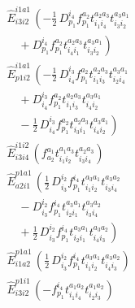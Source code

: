 \documentclass[11pt]{article}
\begin{document}
\begin{align}
&\hat{E}^{i1a1}_{i3i2}\,\left(- \tfrac{1}{2}\, D^{i_{4}}_{p_{1}} f^{a_{2}}_{p_{1}} t^{a_{2}a_{3}}_{i_{1}i_{4}} t^{a_{3}a_{1}}_{i_{3}i_{2}} \right. \\
&\left.\quad + D^{i_{4}}_{p_{1}} f^{a_{2}}_{p_{1}} t^{a_{2}a_{3}}_{i_{4}i_{1}} t^{a_{3}a_{1}}_{i_{3}i_{2}} \right) \\
&\hat{E}^{i1a1}_{p1i2}\,\left(- \tfrac{1}{2}\, D^{i_{3}}_{i_{4}} f^{a_{2}}_{p_{1}} t^{a_{2}a_{3}}_{i_{1}i_{3}} t^{a_{3}a_{1}}_{i_{2}i_{4}} \right. \\
&\left.\quad + D^{i_{3}}_{i_{4}} f^{a_{2}}_{p_{1}} t^{a_{2}a_{3}}_{i_{1}i_{3}} t^{a_{3}a_{1}}_{i_{4}i_{2}} \right. \\
&\left.\quad - \tfrac{1}{2}\, D^{i_{3}}_{i_{4}} f^{a_{2}}_{p_{1}} t^{a_{2}a_{3}}_{i_{3}i_{1}} t^{a_{3}a_{1}}_{i_{4}i_{2}} \right) \\
&\hat{E}^{i1i2}_{i3i4}\,\left(f^{a_{1}}_{a_{2}} t^{a_{1}a_{3}}_{i_{1}i_{2}} t^{a_{2}a_{3}}_{i_{3}i_{4}} \right) \\
&\hat{E}^{p1a1}_{a2i1}\,\left(\tfrac{1}{2}\, D^{i_{2}}_{i_{3}} f^{i_{4}}_{p_{1}} t^{a_{3}a_{1}}_{i_{1}i_{2}} t^{a_{3}a_{2}}_{i_{3}i_{4}} \right. \\
&\left.\quad - D^{i_{2}}_{i_{3}} f^{i_{4}}_{p_{1}} t^{a_{3}a_{1}}_{i_{2}i_{1}} t^{a_{3}a_{2}}_{i_{3}i_{4}} \right. \\
&\left.\quad + \tfrac{1}{2}\, D^{i_{2}}_{i_{3}} f^{i_{4}}_{p_{1}} t^{a_{3}a_{1}}_{i_{2}i_{1}} t^{a_{3}a_{2}}_{i_{4}i_{3}} \right) \\
&\hat{E}^{p1a1}_{i1a2}\,\left(\tfrac{1}{2}\, D^{i_{2}}_{i_{3}} f^{i_{4}}_{p_{1}} t^{a_{3}a_{1}}_{i_{1}i_{2}} t^{a_{3}a_{2}}_{i_{4}i_{3}} \right) \\
&\hat{E}^{p1i1}_{i3i2}\,\left(- f^{i_{4}}_{p_{1}} t^{a_{1}a_{2}}_{i_{1}i_{4}} t^{a_{1}a_{2}}_{i_{2}i_{3}} \right)
\end{align}
\end{document}
